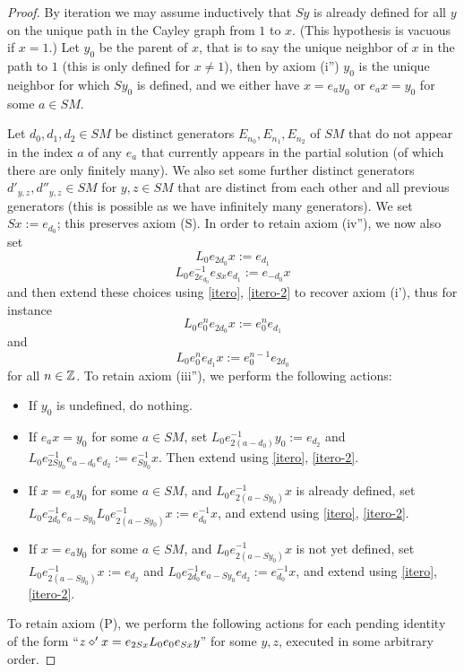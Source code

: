 \begin{proof} By iteration we may assume inductively that $Sy$ is already defined for all $y$ on the unique path in the Cayley graph from $1$ to $x$.  (This hypothesis is vacuous if $x=1$.)  Let $y_0$ be the parent of $x$, that is to say the unique neighbor of $x$ in the path to $1$ (this is only defined for $x \neq 1$), then by axiom (i'') $y_0$ is the unique neighbor for which $Sy_0$ is defined, and we either have $x = e_a y_0$ or $e_a x = y_0$ for some $a \in SM$.

Let $d_0, d_1, d_2 \in SM$ be distinct generators $E_{n_0}, E_{n_1}, E_{n_2}$ of $SM$ that do not appear in the index $a$ of any $e_a$ that currently appears in the partial solution (of which there are only finitely many).  We also set some further distinct generators $d'_{y,z}, d''_{y,z} \in SM$ for $y,z \in SM$ that are distinct from each other and all previous generators (this is possible as we have infinitely many generators).  We set $Sx := e_{d_0}$; this preserves axiom (S).  In order to retain axiom (iv''), we now also set
$$ L_0 e_{2d_0} x := e_{d_1}$$
$$ L_0 e_{2e_{d_0}}^{-1} e_{Sx} e_{d_1} := e_{-d_0} x$$
and then extend these choices using \eqref{itero}, \eqref{itero-2} to recover axiom (i'), thus for instance
$$ L_0 e_0^n e_{2d_0} x := e_0^n e_{d_1}$$
and
$$ L_0 e_0^n e_{d_1} x := e_0^{n-1} e_{2d_0}$$
for all $n \in \mathbb{Z}$.  To retain axiom (iii''), we perform the following actions:
\begin{itemize}
\item If $y_0$ is undefined, do nothing.
\item If $e_a x = y_0$ for some $a \in SM$, set $L_0 e_{2(a-d_0)}^{-1} y_0 := e_{d_2}$ and $L_0 e_{2Sy_0}^{-1} e_{a-d_0} e_{d_2} := e_{Sy_0}^{-1} x$.  Then extend using \eqref{itero}, \eqref{itero-2}.
\item If $x = e_a y_0$ for some $a \in SM$, and $L_0 e_{2(a-Sy_0)}^{-1} x$ is already defined, set $L_0 e_{2d_0}^{-1} e_{a-Sy_0} L_0 e_{2(a-Sy_0)}^{-1} x :=e_{d_0}^{-1} x$, and extend using \eqref{itero}, \eqref{itero-2}.
\item If $x = e_a y_0$ for some $a \in SM$, and $L_0 e_{2(a-Sy_0)}^{-1} x$ is not yet defined, set $L_0 e_{2(a-Sy_0)}^{-1} x := e_{d_2}$ and $L_0 e_{2d_0}^{-1} e_{a-Sy_0} e_{d_2} := e_{d_0}^{-1} x$, and extend using \eqref{itero}, \eqref{itero-2}.
\end{itemize}
To retain axiom (P), we perform the following actions for each pending identity of the form ``$z \diamond' x = e_{2Sx} L_0 e_0 e_{Sx} y$'' for some $y,z$, executed in some arbitrary order.

\end{proof}
